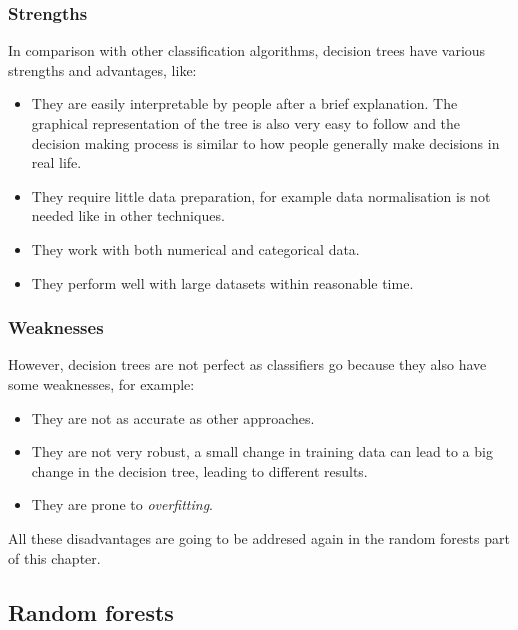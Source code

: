\documentclass[11pt]{article}
\begin{document}
      \subsubsection{Strengths}
        In comparison with other classification algorithms, decision trees have various strengths and advantages, like:
        \begin{itemize}
        \item They are easily interpretable by people after a brief explanation. The graphical representation of the tree is also very easy to follow and the decision making process is similar to how people generally make decisions in real life. \citep{isl}
        \item They require little data preparation, for example data normalisation is not needed like in other techniques. \citep{isl}
        \item They work with both numerical and categorical data. \citep{isl}
        \item They perform well with large datasets within reasonable time. \citep{breiman}
        \end{itemize}
      \subsubsection{Weaknesses}
        However, decision trees are not perfect as classifiers go because they also have some weaknesses, for example:
        \begin{itemize}
        \item They are not as accurate as other approaches. \citep{isl}
        \item They are not very robust, a small change in training data can lead to a big change in the decision tree, leading to different results. \citep{isl}
        \item They are prone to {\it overfitting}. \citep{isl}
        \end{itemize}
        All these disadvantages are going to be addresed again in the random forests part of this chapter.
    \newpage 
    \subsection{Random forests}
  \newpage
\end{document}
